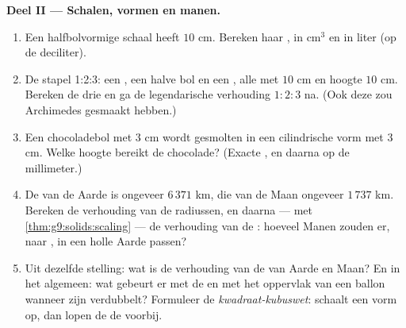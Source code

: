\begin{problem}
\medskip
\noindent\textbf{Deel II --- Schalen, vormen en manen.}
\begin{enumerate}[resume]
  \item Een halfbolvormige schaal heeft  $10$ cm. Bereken haar , in
        cm$^3$ en in liter (op de deciliter).
  \item De stapel 1:2:3: een , een halve bol en een , alle met 
        $10$ cm en hoogte $10$ cm. Bereken de drie  en ga de legendarische
        verhouding $1 : 2 : 3$ na. (Ook deze zou Archimedes gesmaakt hebben.)
  \item Een chocoladebol met  $3$ cm wordt gesmolten in een cilindrische vorm
        met  $3$ cm. Welke hoogte bereikt de chocolade? (Exacte , en
        daarna op de millimeter.)
  \item De  van de Aarde is ongeveer $6\,371$ km, die van de Maan ongeveer
        $1\,737$ km. Bereken de verhouding van de radiussen, en daarna --- met
        \cref{thm:g9:solids:scaling} --- de verhouding van de : hoeveel
        Manen zouden er, naar , in een holle Aarde passen?
  \item Uit dezelfde stelling: wat is de verhouding van de \emph{} van
        Aarde en Maan? En in het algemeen: wat gebeurt er met de  en met het
        oppervlak van een ballon wanneer zijn  verdubbelt? Formuleer de
        \emph{kwadraat-kubuswet}: schaalt een vorm op, dan lopen de  de
         voorbij.
\end{enumerate}


\end{problem}
